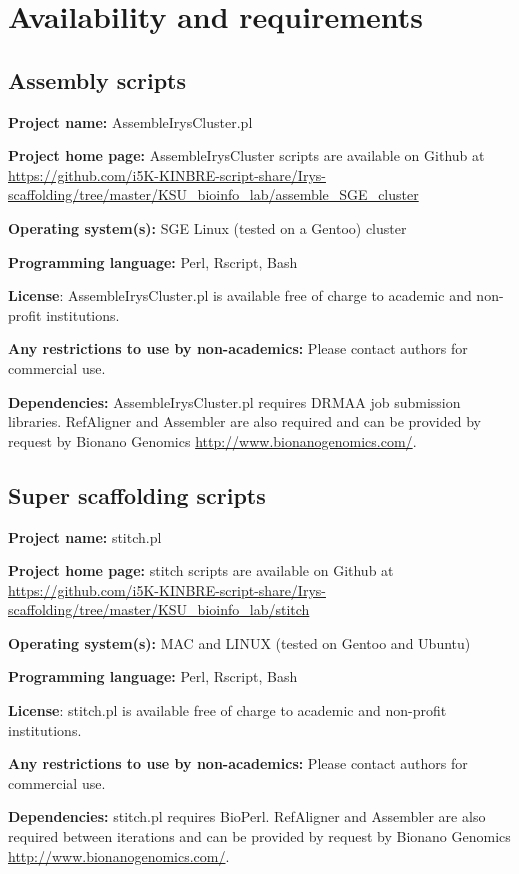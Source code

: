 \documentclass{bmcart}
\begin{document}
\section*{Availability and requirements}

\subsection*{\textbf{Assembly scripts}}

\textbf{Project name:} AssembleIrysCluster.pl

\textbf{Project home page:} AssembleIrysCluster scripts are available on Github at \url{https://github.com/i5K-KINBRE-script-share/Irys-scaffolding/tree/master/KSU\_bioinfo\_lab/assemble\_SGE\_cluster}

\textbf{Operating system(s):} SGE Linux (tested on a Gentoo) cluster

\textbf{Programming language:} Perl, Rscript, Bash

\textbf{License}: AssembleIrysCluster.pl is available free of charge to academic and non-profit institutions.

\textbf{Any restrictions to use by non-academics:} Please contact authors for commercial use.

\textbf{Dependencies:} AssembleIrysCluster.pl requires DRMAA job submission libraries. RefAligner and Assembler are also required and can be provided by request by Bionano Genomics \url{http://www.bionanogenomics.com/}.

\subsection*{\textbf{Super scaffolding scripts}}

\textbf{Project name:} stitch.pl

\textbf{Project home page:} stitch scripts are available on Github at \url{https://github.com/i5K-KINBRE-script-share/Irys-scaffolding/tree/master/KSU\_bioinfo\_lab/stitch}

\textbf{Operating system(s):} MAC and LINUX (tested on Gentoo and Ubuntu)

\textbf{Programming language:} Perl, Rscript, Bash

\textbf{License}: stitch.pl is available free of charge to academic and non-profit institutions.

\textbf{Any restrictions to use by non-academics:} Please contact authors for commercial use.

\textbf{Dependencies:} stitch.pl requires BioPerl. RefAligner and Assembler are also required between iterations and can be provided by request by Bionano Genomics \url{http://www.bionanogenomics.com/}.
\end{document}
